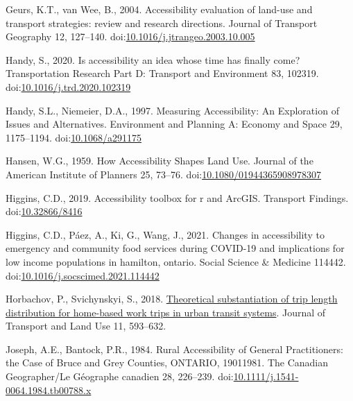 \documentclass[]{elsarticle} %
\newlength{\cslhangindent}
\newlength{\cslentryspacingunit} %
\newenvironment{CSLReferences}[2] %
 {%
  \setlength{\parindent}{0pt}
  \ifodd #1
  \let\oldpar\par
  \def\par{\hangindent=\cslhangindent\oldpar}
  \fi
  \setlength{\parskip}{#2\cslentryspacingunit}
 }%
 {}
\begin{document}
\begin{CSLReferences}{1}{0}
\leavevmode{}%
Geurs, K.T., van Wee, B., 2004. Accessibility evaluation of land-use and
transport strategies: review and research directions. Journal of
Transport Geography 12, 127--140.
doi:\href{https://doi.org/10.1016/j.jtrangeo.2003.10.005}{10.1016/j.jtrangeo.2003.10.005}

\leavevmode{}%
Handy, S., 2020. Is accessibility an idea whose time has finally come?
Transportation Research Part D: Transport and Environment 83, 102319.
doi:\href{https://doi.org/10.1016/j.trd.2020.102319}{10.1016/j.trd.2020.102319}

\leavevmode{}%
Handy, S.L., Niemeier, D.A., 1997. Measuring {Accessibility}: {An}
{Exploration} of {Issues} and {Alternatives}. Environment and Planning
A: Economy and Space 29, 1175--1194.
doi:\href{https://doi.org/10.1068/a291175}{10.1068/a291175}

\leavevmode{}%
Hansen, W.G., 1959. How Accessibility Shapes Land Use. Journal of the
American Institute of Planners 25, 73--76.
doi:\href{https://doi.org/10.1080/01944365908978307}{10.1080/01944365908978307}

\leavevmode{}%
Higgins, C.D., 2019. Accessibility toolbox for r and ArcGIS. Transport
Findings. doi:\href{https://doi.org/10.32866/8416}{10.32866/8416}

\leavevmode{}%
Higgins, C.D., Páez, A., Ki, G., Wang, J., 2021. Changes in
accessibility to emergency and community food services during COVID-19
and implications for low income populations in hamilton, ontario. Social
Science \& Medicine 114442.
doi:\href{https://doi.org/10.1016/j.socscimed.2021.114442}{10.1016/j.socscimed.2021.114442}

\leavevmode{}%
Horbachov, P., Svichynskyi, S., 2018.
\href{https://www.jstor.org/stable/26622420}{Theoretical substantiation
of trip length distribution for home-based work trips in urban transit
systems}. Journal of Transport and Land Use 11, 593--632.

\leavevmode{}%
Joseph, A.E., Bantock, P.R., 1984. Rural Accessibility of General
Practitioners: the Case of Bruce and Grey Counties, ONTARIO,
1901{\textendash}1981. The Canadian Geographer/Le Géographe canadien 28,
226--239.
doi:\href{https://doi.org/10.1111/j.1541-0064.1984.tb00788.x}{10.1111/j.1541-0064.1984.tb00788.x}


\end{CSLReferences}
\end{document}
